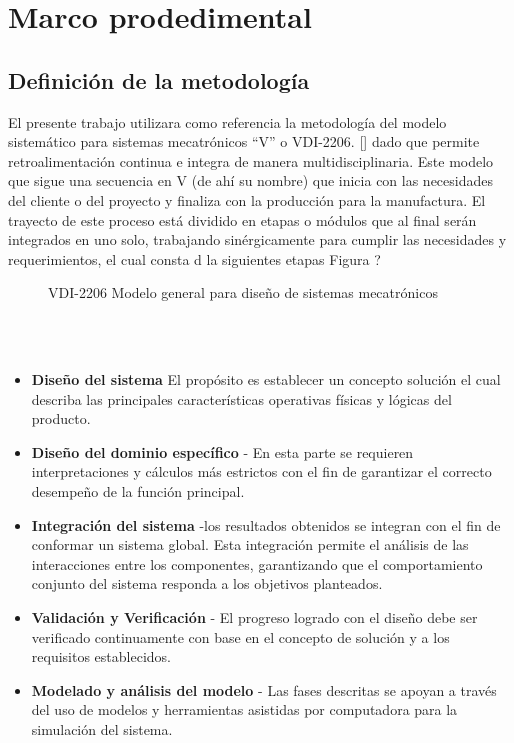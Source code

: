 
\section{Marco prodedimental}


\subsection{Definición de la metodología}

El presente trabajo utilizara como referencia la metodología del modelo sistemático para sistemas mecatrónicos ``V'' o  VDI-2206. [\cite{gausemeier2003new}] dado que permite retroalimentación continua e integra de manera multidisciplinaria. Este modelo que sigue una secuencia en V (de ahí su nombre) que inicia con las necesidades del cliente o del proyecto y finaliza con la producción para la manufactura. El trayecto de este proceso está dividido en etapas o módulos que al final serán integrados en uno solo, trabajando sinérgicamente para cumplir las necesidades y requerimientos, el cual consta d la siguientes etapas Figura ?  \\


\begin{figure}[h]
\centering
\caption{VDI-2206 Modelo general para diseño de sistemas mecatrónicos}
\end{figure}\\
\\

\begin{itemize}
    \item \textbf{Diseño del sistema} El propósito es establecer un concepto solución el cual describa las principales características operativas físicas y lógicas del producto. %
    \item \textbf{Diseño del dominio específico} - En esta parte se requieren interpretaciones y cálculos más estrictos con el fin de garantizar el correcto desempeño de la función principal.
    \item \textbf{Integración del sistema} -los resultados obtenidos  se integran con el fin de conformar un sistema global. Esta integración permite el análisis de las interacciones entre los componentes, garantizando que el comportamiento conjunto del sistema responda a los objetivos planteados.
    \item \textbf{Validación y Verificación} - El progreso logrado con el diseño debe ser verificado continuamente con base en el concepto de solución  y a los requisitos establecidos.
    \item \textbf{Modelado y análisis del modelo} - Las fases descritas se apoyan a través del uso de modelos y herramientas asistidas por computadora para la simulación del sistema.
\end{itemize}

